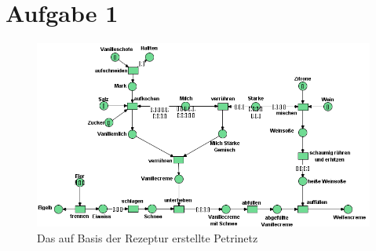 \section*{Aufgabe 1} %
\label{sec:aufgabe_1}
\begin{figure}[ht]
  \includegraphics[width=1.3\textwidth]{pics/sim.png}
  \caption{Das auf Basis der Rezeptur erstellte Petrinetz}
  \label{pic:petrinetz}
\end{figure}
